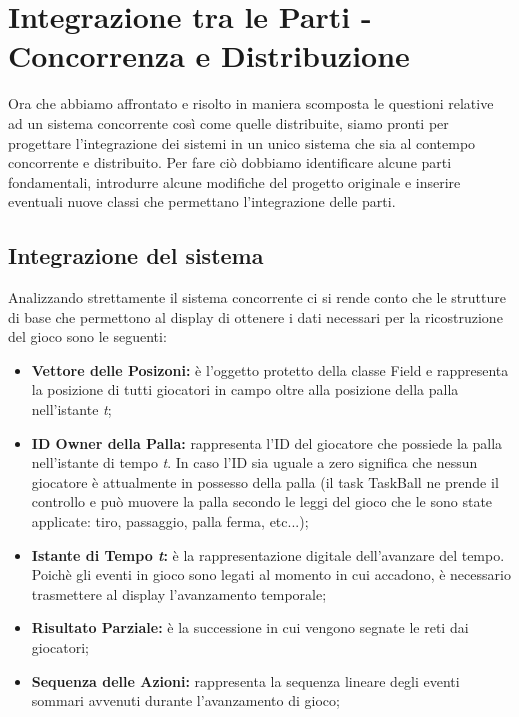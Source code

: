 \documentclass[aps,letterpaper,10pt]{article}
\begin{document}
\newpage

\section{Integrazione tra le Parti - Concorrenza e Distribuzione}
\label{sec:integrazione_tra_le_parti}

Ora che abbiamo affrontato e risolto in maniera scomposta le questioni relative ad un sistema concorrente cos\`i come quelle distribuite, siamo pronti per progettare l'integrazione dei sistemi in un unico sistema che sia al contempo concorrente e distribuito. Per fare ci\`o dobbiamo identificare alcune parti fondamentali, introdurre alcune modifiche del progetto originale e inserire eventuali nuove classi che permettano l'integrazione delle parti.

\subsection{Integrazione del sistema}

Analizzando strettamente il sistema concorrente ci si rende conto che le strutture di base che permettono al display di ottenere i dati necessari per la ricostruzione del gioco sono le seguenti:

\begin{itemize}
\item \textbf{Vettore delle Posizoni:}  \`e l'oggetto protetto della classe Field e rappresenta la posizione di tutti giocatori in campo oltre alla posizione della palla nell'istante \emph{t};
\item \textbf{ID Owner della Palla:} rappresenta l'ID del giocatore che possiede la palla nell'istante di tempo \emph{t}. In caso l'ID sia uguale a zero significa che nessun giocatore \`e attualmente in possesso della palla (il task TaskBall ne prende il controllo e pu\`o muovere la palla secondo le leggi del gioco che le sono state applicate: tiro, passaggio, palla ferma, etc...);
\item \textbf{Istante di Tempo \emph{t}:} \`e la rappresentazione digitale dell'avanzare del tempo. Poich\`e gli eventi in gioco sono legati al momento in cui accadono, \`e necessario trasmettere al display l'avanzamento temporale;
\item \textbf{Risultato Parziale:} \`e la successione in cui vengono segnate le reti dai giocatori;
\item \textbf{Sequenza delle Azioni:} rappresenta la sequenza lineare degli eventi sommari avvenuti durante l'avanzamento di gioco;
\end{itemize}
\end{document}
